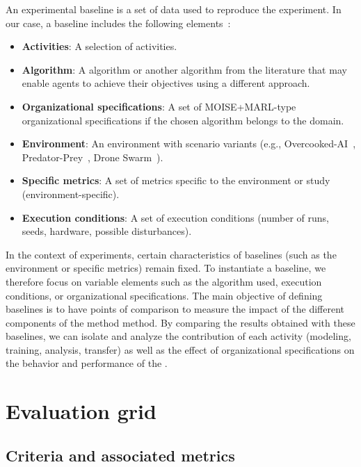 An experimental baseline is a set of data used to reproduce the experiment. In our case, a baseline includes the following elements~:
\begin{itemize}
  \item \textbf{Activities}: A selection of  activities.
  \item \textbf {Algorithm}: A  algorithm or another algorithm from the literature that may enable agents to achieve their objectives using a different approach.
  \item \textbf{Organizational specifications}: A set of MOISE+MARL-type organizational specifications if the chosen algorithm belongs to the  domain.
  \item \textbf{Environment}: An environment with scenario variants (e.g., Overcooked-AI~\cite{overcookedai}, Predator-Prey~\cite{lowe2017multi}, Drone Swarm~\cite{cage_challenge_3_announcement}).
  \item \textbf{Specific metrics}: A set of metrics specific to the environment or study (environment-specific).
  \item \textbf{Execution conditions}: A set of execution conditions (number of runs, seeds, hardware, possible disturbances).
\end{itemize}

In the context of experiments, certain characteristics of baselines (such as the environment or specific metrics) remain fixed. To instantiate a baseline, we therefore focus on variable elements such as the algorithm used, execution conditions, or organizational specifications. The main objective of defining baselines is to have points of comparison to measure the impact of the different components of the  method method. By comparing the results obtained with these baselines, we can isolate and analyze the contribution of each activity (modeling, training, analysis, transfer) as well as the effect of organizational specifications on the behavior and performance of the .



\section{Evaluation grid}\label{sec:evaluation_grid}

\subsection{Criteria and associated metrics}\label{sec:criteria_metrics}

